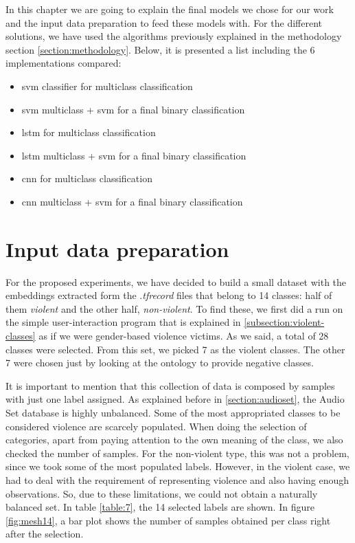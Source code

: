 \label{chapter:experiments}

	In this chapter we are going to explain the final models we chose for our work and the input data preparation to feed these models with. For the different solutions, we have used the algorithms previously explained in the methodology section \ref{section:methodology}. Below, it is presented a list including the 6 implementations compared:
	
	\begin{itemize}
		\item \acrshort{svm} classifier for multiclass classification
		\item \acrshort{svm} multiclass + \acrshort{svm} for a final binary classification
		\item \acrshort{lstm} for multiclass classification
		\item \acrshort{lstm} multiclass + \acrshort{svm} for a final binary classification
		\item \acrshort{cnn} for multiclass classification
		\item \acrshort{cnn} multiclass + \acrshort{svm} for a final binary classification
	\end{itemize}
	

\section{Input data preparation}
\label{section:input-data-preparation}

	For the proposed experiments, we have decided to build a small dataset with the embeddings extracted form the .\textit{tfrecord} files that belong to 14 classes: half of them \textit{violent} and the other half, \textit{non-violent}. To find these, we first did a run on the simple user-interaction program that is explained in \ref{subsection:violent-classes} as if we were gender-based violence victims. As we said, a total of 28 classes were selected. From this set, we picked 7 as the violent classes. The other 7 were chosen just by looking at the ontology to provide negative classes.
	
	It is important to mention that this collection of data is composed by samples with just one label assigned. As explained before in \ref{section:audioset}, the Audio Set database is highly unbalanced. Some of the most appropriated classes to be considered violence are scarcely populated. When doing the selection of categories, apart from paying attention to the own meaning of the class, we also checked the number of samples. For the non-violent type, this was not a problem, since we took some of the most populated labels. However, in the violent case, we had to deal with the requirement of representing violence and also having enough observations. So, due to these limitations, we could not obtain a naturally balanced set. In table \ref{table:7}, the 14 selected labels are shown. %
	In figure \ref{fig:mesh14}, a bar plot shows the number of samples obtained per class right after the selection. 
	
